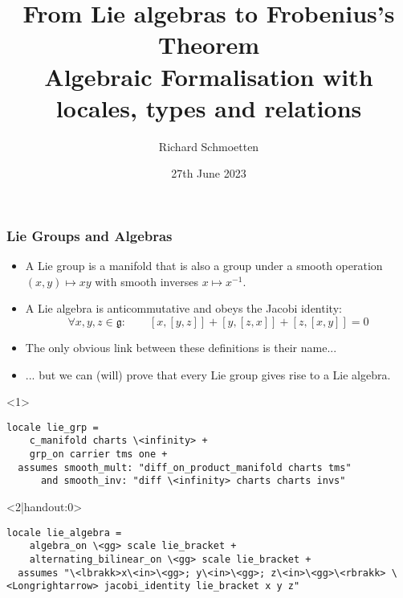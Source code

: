 \documentclass[12pt,notheorems,aspectratio=169,handout]{beamer} %
\title[]{%
  From Lie algebras to Frobenius's Theorem\\%
  \normalsize{Algebraic Formalisation with locales, types and relations}}
\author{Richard Schmoetten}
\institute{The University of Edinburgh}
\date{27th June 2023}
\begin{document}


\begin{frame}
  \titlepage
\end{frame}
\note{}



\begin{frame}[fragile]\frametitle{Lie Groups and Algebras}
\begin{overlayarea}{\textwidth}{.4\textheight}
\begin{itemize}[< +- >]
\item<1- > A Lie group is a manifold that is also a group under a smooth operation $(x,y) \mapsto xy$ with smooth inverses $x \mapsto x^{-1}$.
\item<1- > A Lie algebra is anticommutative and obeys the Jacobi identity:
  \[\forall x,y,z \in \mathfrak g: \qquad [x, [y, z]] + [y, [z, x]] + [z, [x, y]] = 0\]
\item<1- |handout:0> The only obvious link between these definitions is their name...
\item<4- |handout:0> ... but we can (will) prove that every Lie group gives rise to a Lie algebra.
\end{itemize}
\end{overlayarea}

\begin{overlayarea}{\textwidth}{.5\textheight}
\begin{onlyenv}<1>
\begin{lstlisting}
locale lie_grp =
    c_manifold charts \<infinity> +
    grp_on carrier tms one +
  assumes smooth_mult: "diff_on_product_manifold charts tms"
      and smooth_inv: "diff \<infinity> charts charts invs"
\end{lstlisting}
\end{onlyenv}
\begin{onlyenv}<2|handout:0>
\begin{lstlisting}
locale lie_algebra =
    algebra_on \<gg> scale lie_bracket +
    alternating_bilinear_on \<gg> scale lie_bracket +
  assumes "\<lbrakk>x\<in>\<gg>; y\<in>\<gg>; z\<in>\<gg>\<rbrakk> \<Longrightarrow> jacobi_identity lie_bracket x y z"
\end{lstlisting}
\end{onlyenv}
\end{overlayarea}

\end{frame}
\end{document}
